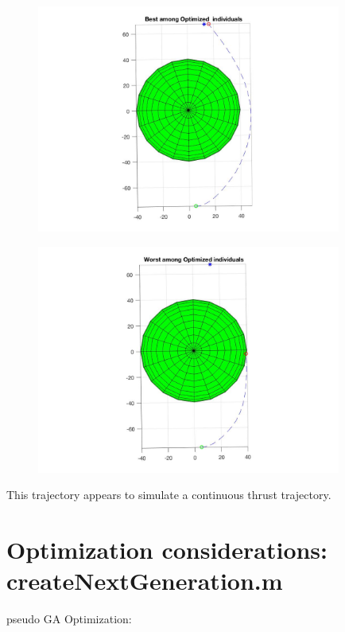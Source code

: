 \documentclass[a4paper,6pt]{article}
\theoremstyle{Definition}
\theoremstyle{Theorem}
\begin{document}
\begin{figure}[H]
 	\begin{center}
 		\includegraphics[width=10cm]{Best_result_ever.jpg}
 		
 	\end{center}
 \end{figure}
 
 
 \begin{figure}[H]
 	\begin{center}
 		\includegraphics[width=10cm]{worst_among_optimized_individuals.jpg}
 		
 	\end{center}
 \end{figure}
 
 
 This trajectory appears to simulate a continuous thrust trajectory.

\section{Optimization considerations: createNextGeneration.m }


pseudo GA Optimization:\\
\end{document}
